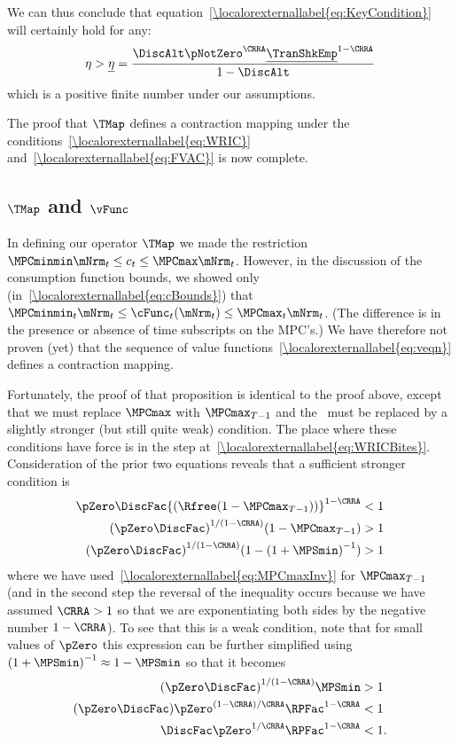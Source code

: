 \documentclass[\econtexRoot/BufferStockTheory]{subfiles}
\begin{document}
We can thus conclude that equation~\eqref{\localorexternallabel{eq:KeyCondition}} will certainly hold for any:
\begin{equation}\begin{gathered}\begin{aligned}
      \eta>\underline{\eta}=\frac{\DiscAlt\pNotZero^{\CRRA}\underline{\TranShkEmp}^{1-\CRRA}}{1-\DiscAlt}
    \end{aligned}\end{gathered}\end{equation}
which is a positive finite number under our assumptions.

The proof that $\TMap$ defines a contraction mapping under the
conditions~\eqref{\localorexternallabel{eq:WRIC}} and~\eqref{\localorexternallabel{eq:FVAC}} is
now complete.

\subsection{
  \texorpdfstring{$\TMap$}{T} and \texorpdfstring{$\vFunc$}{v}}

In defining our operator $\TMap$ we made the restriction
$\MPCminmin \mNrm_{t} \leq c_{t} \leq \MPCmax \mNrm_{t}$.  However,
in the discussion of the consumption function bounds, we
showed only (in~\eqref{\localorexternallabel{eq:cBounds}}) that $\MPCminmin_{t} \mNrm_{t} \leq \cFunc_{t}(\mNrm_{t})
\leq \MPCmax_{t} \mNrm_{t}$.  (The difference is in the presence
or absence of time subscripts on the MPC's.)
We have therefore
not proven (yet) that the sequence of value functions~\eqref{\localorexternallabel{eq:veqn}} defines a contraction mapping.

Fortunately, the proof of that proposition is identical to the proof above, except that we must replace
$\MPCmax$ with $\MPCmax_{T-1}$ and the \WRIC~must be
replaced by a slightly stronger (but still quite weak) condition.  The place where these
conditions have force is in the step at~\eqref{\localorexternallabel{eq:WRICBites}}.
Consideration of the prior two equations reveals that
a sufficient stronger condition is
\begin{align*}
  \pZero \DiscFac {(\Rfree (1-\MPCmax_{T-1}))}^{1-\CRRA}  & < 1
  \\  {(\pZero \DiscFac)}^{1/(1-\CRRA)}  (1-\MPCmax_{T-1})  & > 1
  \\  {(\pZero \DiscFac)}^{1/(1-\CRRA)}  (1-{(1+\MPSmin)}^{-1})  & > 1
\end{align*}
where we have used~\eqref{\localorexternallabel{eq:MPCmaxInv}} for $\MPCmax_{T-1}$ (and in the second step the reversal of the inequality occurs because we have assumed $\CRRA > 1$ so that we are exponentiating both sides by the negative number $1-\CRRA$).  To see that this is a weak condition, note that for small values of
$\pZero$ this expression can be further simplified using ${(1+\MPSmin)}^{-1}
\approx 1-\MPSmin$ so that it becomes
\begin{align*}
  {(\pZero \DiscFac)}^{1/(1-\CRRA)}  \MPSmin  & > 1
  \\  (\pZero \DiscFac)  \pZero^{(1-\CRRA)/\CRRA} \RPFac^{1-\CRRA}  & < 1
  \\  \DiscFac  \pZero^{1/\CRRA} \RPFac^{1-\CRRA}  & < 1.
\end{align*}
\end{document}
